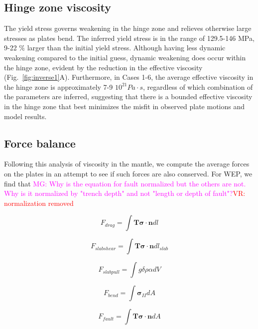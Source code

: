 \documentclass[12pt]{article}
\newcommand{\mgnote}[1]{\textcolor{magenta}{MG: #1}}
\newcommand{\vrnote}[1]{\textcolor{red}{VR: #1}}
\newcommand{\ssigma}{{\ensuremath{\boldsymbol{\sigma}}}}
\begin{document}
{\subsection{Hinge zone viscosity}

The yield stress governs weakening in the hinge zone and relieves otherwise large stresses as plates bend. The inferred yield stress is in the range of 129.5-146 MPa, 9-22 $\%$ larger than the initial yield stress. Although having less dynamic weakening compared to the initial guess, dynamic weakening does occur within the hinge zone, evident by the reduction in the effective viscosity (Fig.~\ref{fig:inverse1}A). Furthermore, in Cases 1-6, the average effective viscosity in the hinge zone is approximately 7-9 $10^{21} Pa\cdot s$, regardless of which combination of the parameters are inferred, suggesting that there is a bounded effective viscosity in the hinge zone that best minimizes the misfit in observed plate motions and model results.



\subsection{Force balance}

Following this analysis of viscosity in the mantle, we compute the average forces on the plates in an attempt to see if such forces are also conserved. For WEP, we find that \mgnote{Why is the equation for fault normalized but the others are not. Why is it normalized by "trench depth" and not "length or depth of fault"?}\vrnote{normalization removed}

\begin{equation}
F_{drag} = \int \textbf{T}\ssigma \cdot \textbf{n} dl
\end{equation}

\begin{equation}
F_{slabshear} = \int \textbf{T}\ssigma \cdot \textbf{n} dl_{slab}
\end{equation}

\begin{equation}
F_{slabpull} = \int g\delta \rho \alpha dV
\end{equation} 
 
\begin{equation}
F_{bend} = \int \ssigma_{II} dA
\end{equation} 

\begin{equation}
F_{fault} = \int \textbf{T}\ssigma\cdot\textbf{n} dA
\end{equation} 


}
\end{document}
